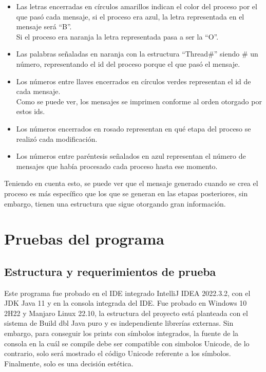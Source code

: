 \documentclass[a4paper]{article}
\begin{document}
    \begin{itemize}
        \item[] Las letras encerradas en c\'irculos amarillos indican el color del proceso por el que pas\'o cada mensaje, si el proceso era azul, la letra representada en el mensaje ser\'a ``B''.\\
        Si el proceso era naranja la letra representada pasa a ser la ``O''.
        \item[] Las palabras se\~naladas en naranja con la estructura ``Thread\#'' siendo \# un n\'umero, representando el id del proceso porque el que pas\'o el mensaje.
        \item[] Los n\'umeros entre llaves encerrados en c\'irculos verdes representan el id de cada mensaje.\\
        Como se puede ver, los mensajes se imprimen conforme al orden otorgado por estos ids.
        \item[] Los n\'umeros encerrados en rosado representan en qu\'e etapa del proceso se realiz\'o cada modificaci\'on.
        \item[] Los n\'umeros entre par\'entesis se\~nalados en azul representan el n\'umero de mensajes que hab\'ia procesado cada proceso hasta ese momento.
    \end{itemize}
    Teniendo en cuenta esto, se puede ver que el mensaje generado cuando se crea el proceso es m\'as espec\'ifico que los que se generan en las etapas posteriores, sin embargo, tienen una estructura que sigue otorgando gran informaci\'on.



    \section{Pruebas del programa}

    \subsection{Estructura y requerimientos de prueba}
    Este programa fue probado en el IDE integrado IntelliJ IDEA 2022.3.2, con el JDK Java 11 y en la consola integrada del IDE.
    Fue probado en Windows 10 2H22 y Manjaro Linux 22.10, la estructura del proyecto est\'a planteada con el sistema de Build dbl Java puro y es independiente librer\'ias externas.
    Sin embargo, para conseguir los prints con s\'imbolos integrados, la fuente de la consola en la cu\'al se compile debe ser compatible con simbolos Unicode,
    de lo contrario, solo ser\'a mostrado el c\'odigo Unicode referente a los s\'imbolos.
    Finalmente, solo es una decisi\'on est\'etica.
\end{document}
